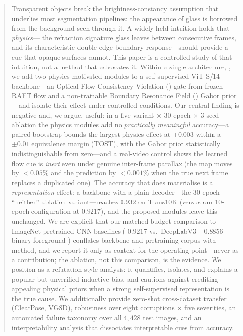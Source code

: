 \begin{abstract}
Transparent objects break the brightness-constancy assumption that underlies
most segmentation pipelines: the appearance of glass is borrowed from the
background seen through it. A widely held intuition holds that \emph{physics}---
the refraction signature glass leaves between consecutive frames, and its
characteristic double-edge boundary response---should provide a cue that opaque
surfaces cannot. This paper is a controlled study of that intuition, not a
method that advocates it. Within a single architecture, \spectra, we add two
physics-motivated modules to a self-supervised \dinov{} ViT-S/14 backbone---an
Optical-Flow Consistency Violation (\ofcv) gate from frozen RAFT flow and a
non-trainable Boundary Resonance Field (\brf) Gabor prior---and isolate their
effect under controlled conditions. Our central finding is negative and, we
argue, useful: in a five-variant $\times$ 30-epoch $\times$ 3-seed ablation the
physics modules add no \emph{practically meaningful} accuracy---a paired
bootstrap bounds the largest physics effect at $+0.003$ \iou{} within a
$\pm0.01$ equivalence margin (TOST), with the Gabor prior statistically
indistinguishable from zero---and a real-video control shows the learned flow
cue is \emph{inert} even under genuine inter-frame parallax (the
\ofcv{} map moves by $<0.05\%$ and the prediction by $<0.001\%$ when the true
next frame replaces a duplicated one). The accuracy that does materialise is a
\emph{representation} effect: a \dinov{} backbone with a plain decoder---the
30-epoch ``neither'' ablation variant---reaches $0.932$ \iou{} on Trans10K
(versus our 10-epoch \spectra{} configuration at $0.9217$), and the proposed
modules leave this unchanged. We are explicit that our matched-budget comparison to
ImageNet-pretrained CNN baselines (\spectra{} $0.9217$ vs.\ DeepLabV3+ $0.8856$
binary foreground \iou) conflates backbone and pretraining corpus with method,
and we report it only as context for the operating point---never as a
contribution; the ablation, not this comparison, is the evidence. We position
\spectra{} as a refutation-style analysis: it quantifies, isolates, and explains
a popular but unverified inductive bias, and cautions against crediting appealing
physical priors when a strong self-supervised representation is the true cause.
We additionally provide zero-shot cross-dataset transfer (ClearPose, VGSD),
robustness over eight corruptions $\times$ five severities, an automated failure
taxonomy over all $4{,}428$ test images, and an interpretability analysis that
dissociates interpretable cues from accuracy.
\end{abstract}
